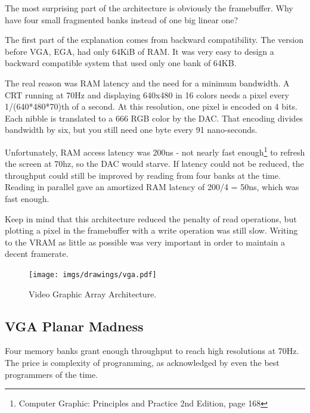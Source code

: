 \documentclass[book.tex]{subfiles}
\begin{document}
The most surprising part of the architecture is obviously the framebuffer. Why have four small fragmented banks instead of one big linear one?\\
\par
The first part of the explanation comes from backward compatibility. The version before VGA, EGA, had only 64KiB of RAM. It was very easy to design a backward compatible system that used only one bank of 64KB.\\
\par
The real reason was RAM latency and the need for a minimum bandwidth. A CRT running at 70Hz and displaying 640x480 in 16 colors needs a pixel every 1/(640*480*70)th of a second. At this resolution, one pixel is encoded on 4 bits. Each nibble is translated to a 666 RGB color by the DAC. That encoding divides bandwidth by six, but you still need one byte every 91 nano-seconds.\\
\par
 Unfortunately, RAM access latency was 200ns - not nearly fast enough\footnote{Computer Graphic: Principles and Practice 2nd Edition, page 168} to refresh the screen at 70hz, so the DAC would starve. If latency could not be reduced, the throughput could still be improved by reading from four banks at the time. Reading in parallel gave an amortized RAM latency of 200/4 = 50ns, which was fast enough.\\
\par
Keep in mind that this architecture reduced the penalty of read operations, but plotting a pixel in the framebuffer with a write operation was still slow. Writing to the VRAM as little as possible was very important in order to maintain a decent framerate. 


\begin{figure}[H]
\centering
\texttt{[image: imgs/drawings/vga.pdf]}
\caption{Video Graphic Array Architecture.}
\label{fig:vga_arch}
\end{figure}




\subsection{VGA Planar Madness}

Four memory banks grant enough throughput to reach high resolutions at 70Hz. The price is complexity of programming, as acknowledged by even the best programmers of the time.\\
\end{document}
